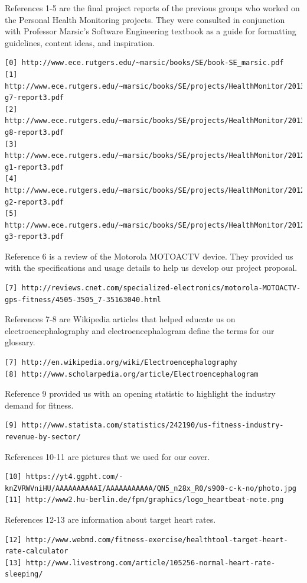 \documentclass[letterpaper,english, 12pt]{scrreprt}
\begin{document}
References 1-5 are the final project reports of the previous groups who worked on the Personal Health Monitoring projects. They were consulted in conjunction with Professor Marsic's Software Engineering textbook as a guide for formatting guidelines, content ideas, and inspiration. 
\begin{verbatim}
[0] http://www.ece.rutgers.edu/~marsic/books/SE/book-SE_marsic.pdf
[1] http://www.ece.rutgers.edu/~marsic/books/SE/projects/HealthMonitor/2013-g7-report3.pdf
[2] http://www.ece.rutgers.edu/~marsic/books/SE/projects/HealthMonitor/2013-g8-report3.pdf
[3] http://www.ece.rutgers.edu/~marsic/books/SE/projects/HealthMonitor/2012-g1-report3.pdf
[4] http://www.ece.rutgers.edu/~marsic/books/SE/projects/HealthMonitor/2012-g2-report3.pdf
[5] http://www.ece.rutgers.edu/~marsic/books/SE/projects/HealthMonitor/2012-g3-report3.pdf
\end{verbatim}
Reference 6 is a review of the Motorola MOTOACTV device. They provided us with the specifications and usage details to help us develop our project proposal.
\begin{verbatim}
[7] http://reviews.cnet.com/specialized-electronics/motorola-MOTOACTV-gps-fitness/4505-3505_7-35163040.html
\end{verbatim}

References 7-8 are Wikipedia articles that helped educate us on electroencephalography and electroencephalogram define the terms for our glossary.
\begin{verbatim}
[7] http://en.wikipedia.org/wiki/Electroencephalography
[8] http://www.scholarpedia.org/article/Electroencephalogram
\end{verbatim}

Reference 9 provided us with an opening statistic to highlight the industry demand for fitness.
\begin{verbatim}
[9] http://www.statista.com/statistics/242190/us-fitness-industry-revenue-by-sector/
\end{verbatim}

References 10-11 are pictures that we used for our cover.
\begin{verbatim}
[10] https://yt4.ggpht.com/-knZVRWVniHU/AAAAAAAAAAI/AAAAAAAAAAA/QN5_n28x_R0/s900-c-k-no/photo.jpg
[11] http://www2.hu-berlin.de/fpm/graphics/logo_heartbeat-note.png
\end{verbatim}


References 12-13 are information about target heart rates.
\begin{verbatim}
[12] http://www.webmd.com/fitness-exercise/healthtool-target-heart-rate-calculator
[13] http://www.livestrong.com/article/105256-normal-heart-rate-sleeping/
\end{verbatim}
\end{document}
